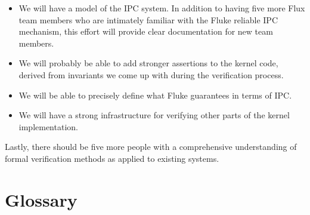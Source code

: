 \documentclass{article}
\begin{document}
\begin{itemize}
\item We will have a model of the IPC system.  In addition to having five more
Flux 
team members who are intimately familiar with the Fluke reliable IPC 
mechanism, this effort will provide clear documentation for new team
members.

\item We will probably be able to add stronger assertions to the
kernel code, derived from invariants we come up with during
the verification process.

\item We will be able to precisely define what Fluke guarantees
in terms of IPC.

\item We will have a strong infrastructure for verifying other
parts of the kernel implementation.

\end{itemize}

Lastly, there should be five more people with a comprehensive
understanding of formal verification methods as applied to
existing systems.

\section*{Glossary}
\end{document}

